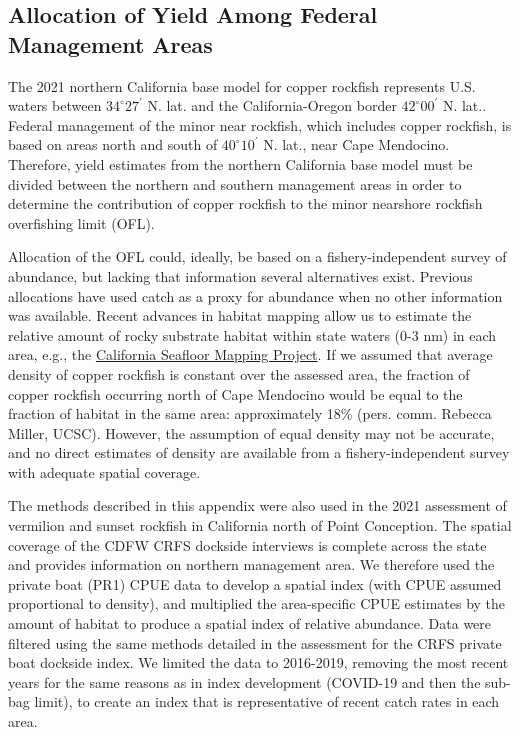\documentclass[11pt,
  letterpaper,
]{article}
\begin{document}
\subsection{Allocation of Yield Among Federal Management Areas}\label{allocation-of-yield-among-federal-management-areas}

The 2021 northern California base model for copper rockfish represents U.S. waters between $34^\circ 27^\prime$ N. lat. and the California-Oregon border $42^\circ 00^\prime$ N. lat.. Federal management of the minor near rockfish, which includes copper rockfish, is based on areas north and south of $40^\circ 10^\prime$ N. lat., near Cape Mendocino. Therefore, yield estimates from the northern California base model must be divided between the northern and southern management areas in order to determine the contribution of copper rockfish to the minor nearshore rockfish overfishing limit (OFL).

Allocation of the OFL could, ideally, be based on a fishery-independent survey of abundance, but lacking that information several alternatives exist. Previous allocations have used catch as a proxy for abundance when no other information was available. Recent advances in habitat mapping allow us to estimate the relative amount of rocky substrate habitat within state waters (0-3 nm) in each area, e.g., the \href{https://walrus.wr.usgs.gov/mapping/csmp/}{California Seafloor Mapping Project}. If we assumed that average density of copper rockfish is constant over the assessed area, the fraction of copper rockfish occurring north of Cape Mendocino would be equal to the fraction of habitat in the same area: approximately 18\% (pers. comm. Rebecca Miller, UCSC). However, the assumption of equal density may not be accurate, and no direct estimates of density are available from a fishery-independent survey with adequate spatial coverage.

The methods described in this appendix were also used in the 2021 assessment of vermilion and sunset rockfish in California north of Point Conception. The spatial coverage of the CDFW CRFS dockside interviews is complete across the state and provides information on northern management area. We therefore used the private boat (PR1) CPUE data to develop a spatial index (with CPUE assumed proportional to density), and multiplied the area-specific CPUE estimates by the amount of habitat to produce a spatial index of relative abundance. Data were filtered using the same methods detailed in the assessment for the CRFS private boat dockside index. We limited the data to 2016-2019, removing the most recent years for the same reasons as in index development (COVID-19 and then the sub-bag limit), to create an index that is representative of recent catch rates in each area.
\end{document}
